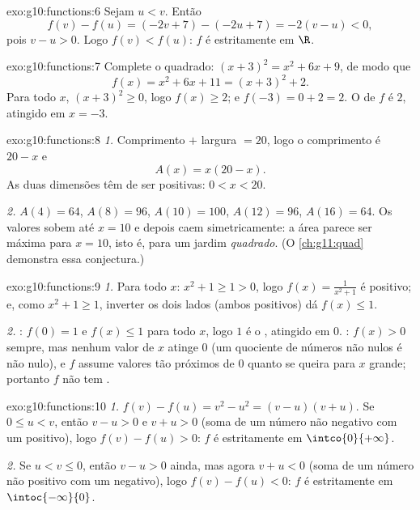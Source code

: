 \begin{solution}{exo:g10:functions:6}
Sejam $u < v$. Então
\[
f(v) - f(u) = (-2v + 7) - (-2u + 7) = -2(v - u) < 0,
\]
pois $v - u > 0$. Logo $f(v) < f(u)$: $f$ é estritamente  em
$\R$.
\end{solution}

\begin{solution}{exo:g10:functions:7}
Complete o quadrado: $(x+3)^2 = x^2 + 6x + 9$, de modo que
\[
f(x) = x^2 + 6x + 11 = (x + 3)^2 + 2 .
\]
Para todo $x$, $(x+3)^2 \geq 0$, logo $f(x) \geq 2$; e
$f(-3) = 0 + 2 = 2$. O  de $f$ é $2$, atingido em $x = -3$.
\end{solution}

\begin{solution}{exo:g10:functions:8}
\emph{1.} Comprimento $+$ largura $= 20$, logo o comprimento é $20 - x$ e
\[
A(x) = x(20 - x).
\]
As duas dimensões têm de ser positivas: $0 < x < 20$.

\emph{2.} $A(4) = 64$, $A(8) = 96$, $A(10) = 100$, $A(12) = 96$,
$A(16) = 64$. Os valores sobem até $x = 10$ e depois caem simetricamente:
a área parece ser máxima para $x = 10$, isto é, para um jardim
\emph{quadrado}. (O \cref{ch:g11:quad} demonstra essa conjectura.)
\end{solution}

\begin{solution}{exo:g10:functions:9}
\emph{1.} Para todo $x$: $x^2 + 1 \geq 1 > 0$, logo
$f(x) = \frac{1}{x^2+1}$ é positivo; e, como $x^2 + 1 \geq 1$, inverter
os dois lados (ambos positivos) dá $f(x) \leq 1$.

\emph{2.} : $f(0) = 1$ e $f(x) \leq 1$ para todo $x$, logo $1$ é o
, atingido em $0$. : $f(x) > 0$ sempre, mas nenhum valor de
$x$ atinge $0$ (um quociente de números não nulos é não nulo), e $f$
assume valores tão próximos de $0$ quanto se queira para $x$ grande;
portanto $f$ não tem .
\end{solution}

\begin{solution}{exo:g10:functions:10}
\emph{1.} $f(v) - f(u) = v^2 - u^2 = (v-u)(v+u)$. Se $0 \leq u < v$,
então $v - u > 0$ e $v + u > 0$ (soma de um número não negativo com um
positivo), logo $f(v) - f(u) > 0$: $f$ é estritamente  em
$\intco{0}{+\infty}$.

\emph{2.} Se $u < v \leq 0$, então $v - u > 0$ ainda, mas agora
$v + u < 0$ (soma de um número não positivo com um negativo), logo
$f(v) - f(u) < 0$: $f$ é estritamente  em
$\intoc{-\infty}{0}$.
\end{solution}

